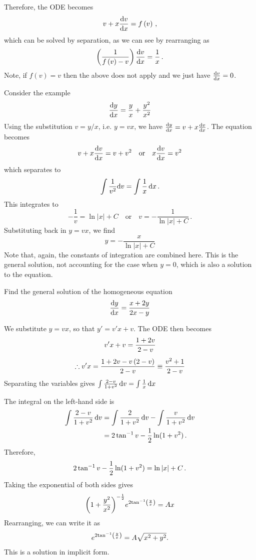 Therefore, the ODE becomes
\[
v+x\frac{{\rm d} v}{{\rm d} x}=f\left(v\right) \, ,
\]
which can be solved by separation, as we can see by rearranging as
\[
\left(\frac{1}{f\left(v\right)-v}\right)\frac{{\rm d} v}{{\rm d} x}=\frac{1}{x} \, .
\]
Note, if $f\left(v\right)=v$ then the above does not apply and we just have $\frac{{\rm d} v}{{\rm d} x}=0$. 

Consider the example
\[
\frac{{\rm d} y}{{\rm d} x}=\frac{y}{x}+\frac{{y}^{2}}{{x}^{2}}
\]
Using the substitution $v=y/x$, i.e. $y=vx$, we have $\frac{{\rm d} y}{{\rm d} x}=v+x\frac{{\rm d} v}{{\rm d} x}$. The equation becomes 
\[
v+x\frac{{\rm d} v}{{\rm d} x}=v+{v}^{2} \quad \text{or} \quad x\frac{{\rm d} v}{{\rm d} x}={v}^{2}
\]
which separates to
\[
\int \frac{1}{{v}^{2}} {\rm d}v=\int \frac{1}{x}\, {\rm d}x \, .
\]
This integrates to 
\[
-\frac{1}{v}=\ln \left|x\right|+C \quad \text{or} \quad v=-\frac{1}{\ln \left|x\right|+C} \, .
\]
Substituting back in $y=vx$, we find
\[
y=-\frac{x}{\ln \left|x\right|+C}
\]
Note that, again, the constants of integration are combined here. This is the general solution, not accounting for the case when $y=0$, which is also a solution to the equation.

\goodbreak
\begin{example}[Lecture]
\label{ex:641}

Find the general solution of the homogeneous equation
\[
\frac{{\rm d} y}{{\rm d} x}=\frac{x+2y}{2x-y}
\]

\end{example}
\begin{solution}

We substitute $y=vx$, so that $y'=v'x+v$. The ODE then becomes
\[
\begin{gathered}
{v}^{\prime }x+v=\frac{1+2v}{2-v}
\\[4pt]
\therefore {v}^{\prime }x=\frac{1+2v-v\left(2-v\right)}{2-v}\equiv \frac{{v}^{2}+1}{2-v}
\end{gathered}
\]
Separating the variables gives $\int \frac{2-v}{1+{v}^{2}}\, {\rm d}v=\int \frac{1}{x}\, {\rm d}x$


The integral on the left-hand side is
\begin{align*}
\int\frac{2-v}{1+v^2}\,{\rm d}v
&=\int\frac{2}{1+v^2}\,{\rm d}v-\int\frac{v}{1+v^2}\,{\rm d}v\\
&=2\tan^{-1}v-\frac12\ln(1+v^2)\, .
\end{align*}
Therefore,
\[
2\tan^{-1}v-\frac12\ln(1+v^2)=\ln|x|+C\, .
\]
Taking the exponential of both sides gives
\[
{\left(1+\frac{{y}^{2}}{{x}^{2}}\right)}^{-\frac{1}{2}}{e}^{2{\tan }^{-1}\left(\frac{y}{x}\right)} =Ax
\]
Rearranging, we can write it as
\[
{e}^{2{\tan }^{-1}\left(\frac{y}{x}\right)} =A\sqrt{{x}^{2}+{y}^{2}} .
\]
This is a solution in implicit form.
\end{solution}

